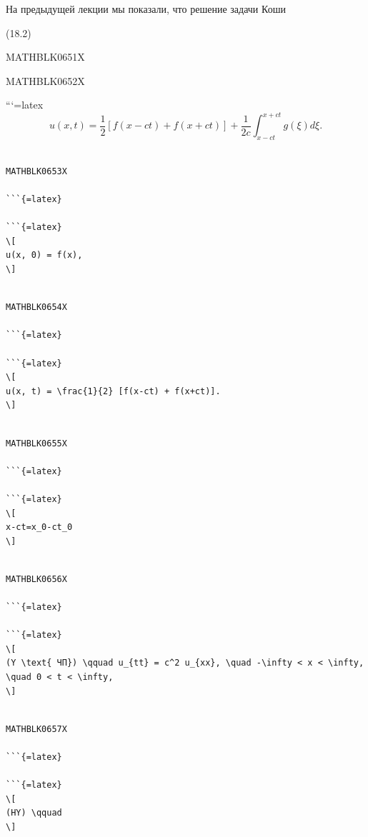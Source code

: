 \documentclass[
]{article}
\begin{document}
На предыдущей лекции мы показали, что решение задачи Коши

(18.2)

MATHBLK0651X

MATHBLK0652X

```{=latex}
\[
u(x, t) = \frac{1}{2} [f(x-ct) + f(x+ct)] + \frac{1}{2c} \int_{x-ct}^{x+ct} g(\xi) d\xi.
\]

\begin{verbatim}

MATHBLK0653X

```{=latex}

```{=latex}
\[
u(x, 0) = f(x),
\]
\end{verbatim}

\begin{verbatim}

MATHBLK0654X

```{=latex}

```{=latex}
\[
u(x, t) = \frac{1}{2} [f(x-ct) + f(x+ct)].
\]
\end{verbatim}

\begin{verbatim}

MATHBLK0655X

```{=latex}

```{=latex}
\[
x-ct=x_0-ct_0
\]
\end{verbatim}

\begin{verbatim}

MATHBLK0656X

```{=latex}

```{=latex}
\[
(Y \text{ ЧП}) \qquad u_{tt} = c^2 u_{xx}, \quad -\infty < x < \infty, \quad 0 < t < \infty,
\]
\end{verbatim}

\begin{verbatim}

MATHBLK0657X

```{=latex}

```{=latex}
\[
(HY) \qquad
\]
\end{verbatim}
\end{document}
